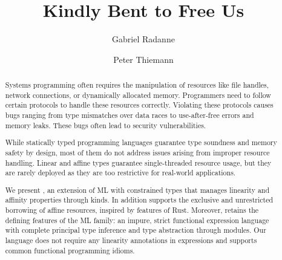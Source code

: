 \documentclass[sigplan,10pt,review,anonymous]{acmart}
\author{Gabriel Radanne}
\affiliation{
  \institution{University of Freiburg}
  \country{Germany}
}
\author{Peter Thiemann}
\affiliation{
  \institution{University of Freiburg}
  \country{Germany}
}
\begin{document}
\title{Kindly Bent to Free Us}
\begin{abstract}
  Systems programming often requires the manipulation of resources like
  file handles, network connections, or dynamically allocated
  memory. Programmers need to follow certain protocols to handle
  these resources correctly. Violating these protocols causes bugs
  ranging from type mismatches over data races to use-after-free 
  errors and memory leaks. These bugs often lead to security  vulnerabilities.

  While statically typed programming languages guarantee type soundness and memory 
  safety by design, most of them do not address issues arising
  from improper resource handling. 
  Linear and affine types guarantee single-threaded resource usage,
  but they are rarely deployed as they are too restrictive for real-world applications.

  We present \lang, an extension of ML with constrained types that
  manages linearity and affinity properties through kinds. In addition
  \lang{} supports the exclusive and unrestricted borrowing of affine
  resources, inspired by features of Rust.
  Moreover, \lang{} retains the defining features of the ML family:
  an impure, strict functional expression language with complete principal type
  inference and type abstraction through modules.
  Our language does not require any linearity annotations in
  expressions and supports common functional programming idioms.
\end{abstract}


\maketitle














\clearpage
\appendix

\clearpage

\clearpage


\end{document}
